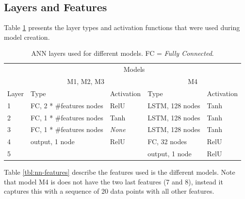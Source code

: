 \subsection{Layers and Features}
Table \ref{tbl:nn-layers} presents the layer types and activation functions that were used during model creation.

\begin{table}[h]
  \centering
  \caption{ANN layers used for different models. FC = \textit{Fully Connected}.}
  \label{tbl:nn-layers}
  \begin{tabular}{l|l|l|l|l}
        & \multicolumn{4}{c}{Models}                                                                                           \\ \cline{2-5} 
        & \multicolumn{2}{c|}{M1, M2, M3}                           & \multicolumn{2}{c}{M4}                                   \\ \hline
  Layer & Type                     & Activation                     & Type                     & Activation                     \\ \hline
  1     & FC, 2 * \#features nodes & RelU                           & LSTM, 128 nodes          & Tanh                        \\
  2     & FC, 1 * \#features nodes & Tanh                           & LSTM, 128 nodes          & Tanh                        \\
  3     & FC, 1 * \#features nodes & \textit{None} & LSTM, 128 nodes          & Tanh                        \\
  4     & output, 1 node           & RelU                           & FC, 32 nodes & RelU                           \\
  5     &                          &                                & output, 1 node           & RelU
  \end{tabular}
  \end{table}

Table \ref{tbl:nn-features} describe the features used is the different models. Note that model M4 is does not have the two last features (7 and 8), instead it captures this with a sequence of 20 data points with all other features.

